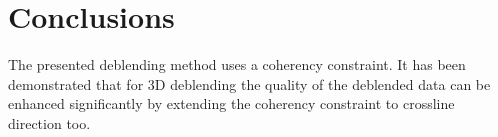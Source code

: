 \FloatBarrier


\section{Conclusions}

The presented deblending method uses a coherency constraint. It has been demonstrated that for 3D deblending the quality of the deblended data can be enhanced significantly by extending the coherency constraint to crossline direction too.


















